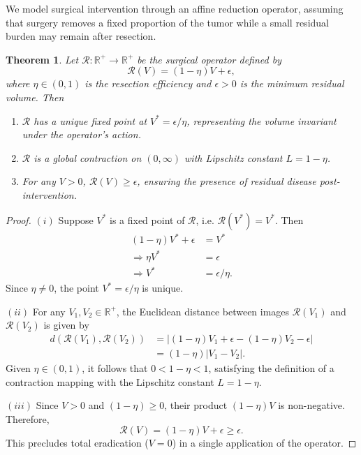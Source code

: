 \documentclass[11pt, reqno]{amsart}
\numberwithin{equation}{section}
\newtheorem{theorem}{Theorem}[section]
\theoremstyle{definition}
\begin{document}
We model surgical intervention through an affine reduction operator, assuming that surgery removes a fixed proportion of the tumor while a small residual burden may remain after resection.

\begin{theorem}\label{Res_op}
Let $\mathcal{R}: \mathbb{R}^+ \to \mathbb{R}^+$ be the surgical operator defined by $$\mathcal{R}(V) = (1-\eta)V + \epsilon,$$ where $\eta \in (0,1)$ is the resection efficiency and $\epsilon > 0$ is the minimum residual volume. Then
\begin{enumerate}
    \item[(i)] %
    $\mathcal{R}$ has a unique fixed point at $V^* = \epsilon/\eta$, representing the volume invariant under the operator's action.
    \vspace{0.15cm}
    
    \item[(ii)] %
    $\mathcal{R}$ is a global contraction on $(0, \infty)$ with Lipschitz constant $L = 1-\eta$.
        \vspace{0.15cm}

    \item[(iii)] %
    For any $V > 0$, $\mathcal{R}(V) \geq \epsilon$, ensuring the presence of residual disease post-intervention.
\end{enumerate}
\end{theorem}

\begin{proof}
$(i)$ Suppose $V^*$ is a fixed point of $\mathcal{R}$, i.e. $\mathcal{R}(V^*) = V^*$. Then
\begin{align*}
     (1-\eta)V^* + \epsilon &= V^*\\
   \Rightarrow \eta V^* &= \epsilon\\
   \Rightarrow V^* &= \epsilon/\eta.
\end{align*}
Since $\eta \neq 0$, the point $V^* = \epsilon/\eta$ is unique.
\vspace{0.15cm}

$(ii)$ For any $V_1, V_2 \in \mathbb{R}^+$, the Euclidean distance between images $\mathcal{R}(V_1)$ and $\mathcal{R}(V_2)$ is given by
\begin{align*}
    d(\mathcal{R}(V_1), \mathcal{R}(V_2)) &= |(1-\eta)V_1 + \epsilon - (1-\eta)V_2 - \epsilon|\\
    &= (1-\eta)|V_1 - V_2|.    
\end{align*}
Given $\eta \in (0,1)$, it follows that $0 < 1-\eta < 1$, satisfying the definition of a contraction mapping with the Lipschitz constant $L = 1 -\eta$.
\vspace{0.15cm}

$(iii)$ Since $V > 0$ and $(1-\eta) \geq 0$, their product $(1-\eta)V$ is non-negative. Therefore, $$\mathcal{R}(V) = (1-\eta)V + \epsilon \geq \epsilon.$$ This precludes total eradication ($V=0$) in a single application of the operator.
\end{proof}
\end{document}
